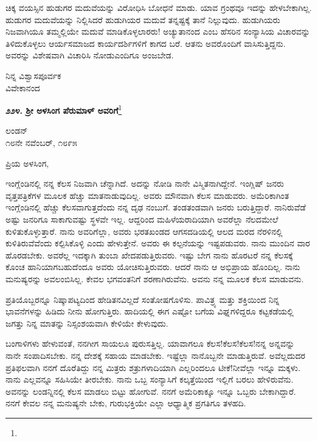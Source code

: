 \vspace{0.1cm}

ಚಿಕ್ಕ ವಯಸ್ಸಿನ ಹುಡುಗರ ಮದುವೆಯನ್ನು ವಿರೋಧಿಸಿ ಬೋಧನೆ ಮಾಡು. ಯಾವ ಗ್ರಂಥವೂ ಇದನ್ನು ಹೇಳಬೇಕಾಗಿಲ್ಲ. ಹುಡುಗರ ಮದುವೆಯನ್ನು ನಿಲ್ಲಿಸಿದರೆ ಹುಡುಗಿಯರ ಮದುವೆ ತನ್ನಷ್ಟಕ್ಕೆ ತಾನೆ ನಿಲ್ಲುವುದು. ಹುಡುಗಿಯರು ನಿಜವಾಗಿಯೂ ತಮ್ಮಲ್ಲಿಯೇ ಮದುವೆ ಮಾಡಿಕೊಳ್ಳಲಾರರು! ಅಚ್ಯುತಾನಂದ ಎಂಬ ಹೆಸರಿನ ಸಂನ್ಯಾಸಿಯ ವಿಚಾರವನ್ನು ತಿಳಿದುಕೊಳ್ಳಲು ಆರ್ಯಸಮಾಜದ ಕಾರ್ಯದರ್ಶಿಗಳಿಗೆ ಕಾಗದ ಬರೆ. ಆತನು ಅವರೊಂದಿಗೆ ವಾಸಿಸುತ್ತಿದ್ದನು. ಅವರನ್ನು ವಿಶೇಷವಾಗಿ ವಿಚಾರಿಸಿ ನೋಡು\enginline{-}ಎಂದಿಗೂ ಅಂಜಬೇಡ.

{\flushright
ನಿನ್ನ ವಿಶ್ವಾಸಪೂರ್ವಕ\\ವಿವೇಕಾನಂದ\par}

\newpage

\begin{center}
\textbf{೨೨೪. ಶ‍್ರೀ ಅಳಸಿಂಗ ಪೆರುಮಾಳ್ ಅವರಿಗೆ}\footnote{}
\end{center}

\begin{flushright}
ಲಂಡನ್\\೧೮ನೇ ನವೆಂಬರ್, ೧೮೯೫
\end{flushright}

\noindent
ಪ್ರಿಯ ಅಳಸಿಂಗ,

ಇಂಗ್ಲೆಂಡಿನಲ್ಲಿ ನನ್ನ ಕೆಲಸ ನಿಜವಾಗಿ ಚೆನ್ನಾಗಿದೆ. ಅದನ್ನು ನೋಡಿ ನಾನೇ ವಿಸ್ಮಿತನಾಗಿದ್ದೇನೆ. ಇಂಗ್ಲಿಷ್ ಜನರು ವೃತ್ತಪತ್ರಿಕೆಗಳ ಮೂಲಕ ಹೆಚ್ಚು ಮಾತನಾಡುವುದಿಲ್ಲ. ಅವರು ಮೌನವಾಗಿ ಕೆಲಸ ಮಾಡುವರು. ಅಮೆರಿಕಾಗಿಂತ ಇಂಗ್ಲೆಂಡಿನಲ್ಲಿ ಹೆಚ್ಚು ಕೆಲಸವಾಗುತ್ತದೆಂದು ನನ್ನ ದೃಢ ನಂಬುಗೆ. ತಂಡತಂಡವಾಗಿ ಜನರು ಬರುತ್ತಿದ್ದಾರೆ. ನಾನಿರುವೆಡೆ ಅಷ್ಟು ಜನರಿಗೂ ಸಾಕಾಗುವಷ್ಟು ಸ್ಥಳವೇ ಇಲ್ಲ. ಆದ್ದರಿಂದ ಮಹಿಳೆಯರಾದಿಯಾಗಿ ಅವರೆಲ್ಲಾ ನೆಲದಮೇಲೆ ಕುಳಿತುಕೊಳ್ಳುತ್ತಾರೆ. ನಾನು ಅವರಿಗೆಲ್ಲಾ, ಅವರು ಭರತಖಂಡದ ಆಗಸದಡಿಯಲ್ಲಿ ಆಲದ ಮರದ ನೆರಳಿನಲ್ಲಿ ಕುಳಿತಿರುವೆವೆಂದು ಕಲ್ಪಿಸಿಕೊಳ್ಳಿ ಎಂದು ಹೇಳುತ್ತೇನೆ. ಅವರು ಈ ಕಲ್ಪನೆಯನ್ನು ಇಷ್ಟಪಡುವರು. ನಾನು ಮುಂದಿನ ವಾರ ಹೊರಡಬೇಕು. ಅವರೆಲ್ಲ ಇದಕ್ಕಾಗಿ ತುಂಬಾ ಖೇದಪಡುತ್ತಿರುವರು. ಇಷ್ಟು ಬೇಗ ನಾನು ಹೊರಟರೆ ನನ್ನ ಕೆಲಸಕ್ಕೆ ಕೊಂಚ ಹಾನಿಯಾಗಬಹುದೆಂದೂ ಅವರು ಯೋಚಿಸುತ್ತಿರುವರು. ಆದರೆ ನಾನು ಆ ಅಭಿಪ್ರಾಯ ಹೊಂದಿಲ್ಲ. ನಾನು ಮನುಷ್ಯರನ್ನು ಅವಲಂಬಿಸಿಲ್ಲ. ಕೇವಲ ಭಗವಂತನಿಗೆ ಶರಣಾಗಿರುವೆನು. ಅವನು ನನ್ನ ಮೂಲಕ ಕೆಲಸ ಮಾಡುವನು.

ಪ್ರತಿಯೊಬ್ಬರನ್ನೂ ನಿಷ್ಕಾಪಟ್ಯದಿಂದ ಹೇಡಿತನವಿಲ್ಲದೆ ಸಂತೋಷಗೊಳಿಸು. ಪಾವಿತ್ರ್ಯ ಮತ್ತು ಶಕ್ತಿಯಿಂದ ನಿನ್ನ ಭಾವನೆಗಳನ್ನು ಹಿಡಿದು ನೀನು ಹೋಗುತ್ತಿರು. ಹಾದಿಯಲ್ಲಿ ಈಗ ಎಷ್ಟೋ ಬಗೆಯ ವಿಘ್ನಗಳಿದ್ದರೂ ಕಟ್ಟಕಡೆಯಲ್ಲಿ ಜಗತ್ತು ನಿನ್ನ ಮಾತನ್ನು ನಿಸ್ಸಂಶಯವಾಗಿ ಕೇಳಿಯೇ ಕೇಳುವುದು.

ಬಂಗಾಳಿಗಳು ಹೇಳುವಂತೆ, ನನಗೀಗ ಸಾಯಲೂ ಪುರುಸತ್ತಿಲ್ಲ. ಯಾವಾಗಲೂ ಕೆಲಸ!ಕೆಲಸ!ಕೆಲಸ!ನನ್ನ ಅನ್ನವನ್ನು ನಾನೇ ಸಂಪಾದಿಸಬೇಕು. ನನ್ನ ದೇಶಕ್ಕೆ ಸಹಾಯ ಮಾಡಬೇಕು. ಇಷ್ಟೆಲ್ಲಾ ನಾನೊಬ್ಬನೇ ಮಾಡುತ್ತಿರುವೆ. ಅವೆಲ್ಲದುದರ ಪ್ರತಿಫಲವಾಗಿ ನನಗೆ ದೊರೆತಿದ್ದು ನನ್ನ ಮಿತ್ರರು ಶತ್ರುಗಳಾದಿಯಾಗಿ ಎಲ್ಲರಿಂದಲೂ ಟೀಕೆ!ನೀವೆಲ್ಲಾ ಇನ್ನೂ ಮಕ್ಕಳು. ನಾನು ಎಲ್ಲವನ್ನೂ ಸಹಿಸಿಯೇ ತೀರಬೇಕು. ನಾನು ಒಬ್ಬ ಸಂನ್ಯಾಸಿಗೆ ಕಲ್ಕತ್ತೆಯಿಂದ ಇಲ್ಲಿಗೆ ಬರಲು ಹೇಳಿರುವೆನು. ಅವನನ್ನು ಲಂಡನ್ನಿನಲ್ಲಿ ಕೆಲಸ ಮಾಡಲು ಬಿಟ್ಟು ಹೋಗುವೆ. ನನಗೆ ಅಮೆರಿಕಾಕ್ಕೂ ಇನ್ನೂ ಒಬ್ಬರು ಬೇಕಾಗಿದ್ದಾರೆ. ನನಗೆ ಕೇವಲ ನನ್ನ ಮನುಷ್ಯನೇ ಬೇಕು, ಗುರುಭಕ್ತಿಯೇ ಎಲ್ಲಾ ಆಧ್ಯಾತ್ಮಿಕ ಪ್ರಗತಿಗೂ ತಳಹದಿ.

